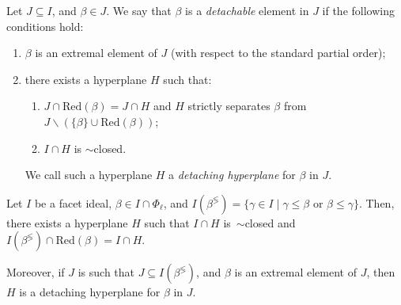 \documentclass[ALCO,published]{cedram}
\theoremstyle{plain}
\newcommand\smeno{\smallsetminus}
\newcommand\be{\beta}
\newcommand\ga{\gamma}
\newcommand\comp{\lessgtr}
\newcommand\red{\mathrm{Red}}
\renewcommand{\leq}{\leqslant}
\begin{document}
\begin{defi}\label{def:detachable}
Let $J\subseteq I$, and $\be\in J$.
We say that $\be$ is a {\it detachable} element in $J$ if the following conditions hold:
\begin{enumerate}
\item
$\be$ is an extremal element of $J$ \upn(with respect to the standard partial order\upn); 
\label{itm:extremal}
\item there exists a hyperplane $H$ such that:
\begin{enumerate}[label=\textup{(\alph*)}]
\item  $J\cap \red(\be)=J\cap H$ and $H$ strictly separates $\be$ from $J\smeno(\{\be\}\cup \red(\be))$;
\label{itm:separa}
\item
$I\cap H $ is  $\sim$closed.
\label{itm:chiuso} 
\end{enumerate}
\label{itm:hyperplane}
We call such a hyperplane $H$ a {\it detaching hyperplane} for $\be$ in $J$.
\end{enumerate}
\end{defi}


\begin{lem}\label{lem:detachable}
Let $I$ be a facet ideal, $\be\in I\cap \Phi_\ell$, and $I(\be^{\comp})=\{\ga\in I\mid \ga\leq\be\text{ or } \be\leq \ga\}.$ 
Then, there exists a hyperplane $H$ such that $I\cap H$ is~$\sim$closed  and $I(\be^{\comp})\cap \red(\be)=I\cap H$.
\par
Moreover, if $J$ is such that $J\subseteq I(\be^{\comp})$, and $\be$ is an extremal element of $J$, then $H$ is a detaching hyperplane for $\be$ in $J$.
\end{lem}
\end{document}
